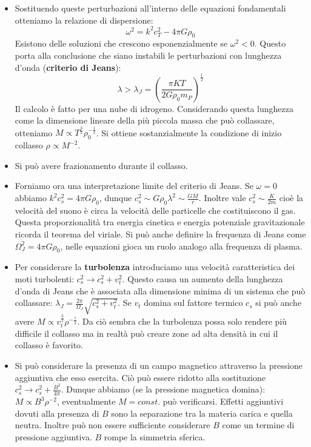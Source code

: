 \documentclass[11pt,a4paper]{article}
\begin{document}
\begin{itemize}
\item Sostituendo queste perturbazioni all'interno delle equazioni fondamentali otteniamo la relazione di dispersione:
\begin{equation}
\omega^2 = k^2 c_T^2 - 4 \pi G \rho_0
\end{equation}
Esistono delle soluzioni che crescono esponenzialmente se $\omega^2 < 0$. Questo porta alla conclusione che siano instabili le perturbazioni con lunghezza d'onda (\textbf{criterio di Jeans}):
\begin{equation}
\lambda > \lambda_J = \left( \frac{\pi K T}{2 G \rho_0 m_P} \right) ^ {\frac{1}{2}}
\end{equation}
Il calcolo è fatto per una nube di idrogeno. Considerando questa lunghezza come la dimensione lineare della più piccola massa che può collassare, otteniamo $M \propto T^{\frac{3}{2}} \rho_0^{-\frac{1}{2}}$. Si ottiene sostanzialmente la condizione di inizio collasso $\rho \propto M^{-2}$.

\item Si può avere frazionamento durante il collasso.

\item Forniamo ora una interpretazione limite del criterio di Jeans. Se $\omega = 0$ abbiamo $k^2 c_s^2 = 4 \pi G \rho_0$, dunque $c_s^2 \sim G \rho_0 \lambda^2 \sim \frac{GM}{r}$. Inoltre vale $c_s^2 \sim \frac{K}{2m}$ cioè la velocità del suono è circa la velocità delle particelle che costituiscono il gas. Questa proporzionalità tra energia cinetica e energia potenziale gravitazionale ricorda il teorema del viriale. Si può anche definire la frequenza di Jeans come $\Omega_{J}^{2} = 4 \pi G \rho_0$, nelle equazioni gioca un ruolo analogo alla frequenza di plasma.

\item Per considerare la \textbf{turbolenza} introduciamo una velocità caratteristica dei moti turbolenti: $c_s^2 \rightarrow c_s^2 + v_t^2$. Questo causa un aumento della lunghezza d'onda di Jeans che è associata alla dimensione minima di un sistema che può collassare: $\lambda_J = \frac{2 \pi}{\Omega_J} \sqrt{c_s^2+v_t^2}$. Se $v_t$ domina sul fattore termico $c_s$ si può anche avere $M \propto v_t^{\frac{3}{2}} \rho^{-\frac{1}{2}}$. Da ciò sembra che la turbolenza possa solo rendere più difficile il collasso ma in realtà può creare zone ad alta densità in cui il collasso è favorito.

\item Si può considerare la presenza di un campo magnetico attraverso la pressione aggiuntiva che esso esercita. Ciò può essere ridotto alla sostituzione $c_s^2 \rightarrow c_s^2 + \frac{B^2}{4 \pi}$. Dunque abbiamo (se la pressione magnetica domina): $M \propto B^3 \rho^{-2}$, eventualmente $M=const.$ può verificarsi. Effetti aggiuntivi dovuti alla presenza di $B$ sono la separazione tra la materia carica e quella neutra. Inoltre può non essere sufficiente considerare $B$ come un termine di pressione aggiuntiva. $B$ rompe la simmetria sferica.


\end{itemize}
\end{document}
